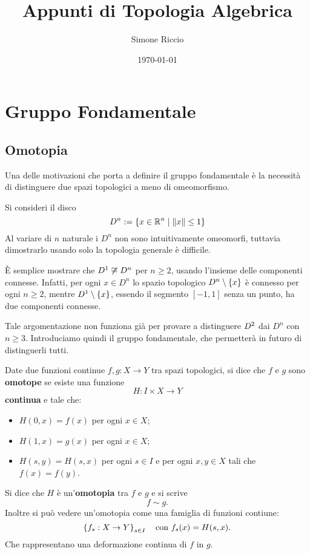 \documentclass[]{article}
\begin{document}
\title{Appunti di Topologia Algebrica}
\author{Simone Riccio}
\date{\today}

\maketitle

\tableofcontents

\section{Gruppo Fondamentale}
\subsection{Omotopia}
    Una delle motivazioni che porta a definire il gruppo fondamentale è la necessità di distinguere
    due spazi topologici a meno di omeomorfismo.

    \begin{example} \nl
        Si consideri il disco 
        \[  
            D^n := \left\{  x \in \mathbb{R}^{n} \mid \left\| x \right\| \leq 1  \right\}
        \]
        Al variare di $n$ naturale i $D^n$ non sono intuitivamente omeomorfi, tuttavia dimostrarlo
        usando solo la topologia generale è difficile.

        È semplice mostrare che $D^{1} \not\cong D^n$ per $n \geq 2$, usando l'insieme delle componenti 
        connesse. Infatti, per ogni $x \in D^n$ lo spazio topologico $D^n \setminus \left\{ x \right\}$ è connesso 
        per ogni $n \geq 2$, mentre $D^{1} \setminus \left\{ x \right\}$, essendo il segmento $[-1,1]$ senza un punto, ha due componenti connesse.
    
        Tale argomentazione non funziona già per provare a distinguere $D^{2}$ dai $D^n$ con $n \geq 3$.
        Introduciamo quindi il gruppo fondamentale, che permetterà in futuro di distinguerli tutti.
    \end{example}

    \begin{definition}[Omotopia] \nl
        Date due funzioni continue $f,g: X \to Y$ tra spazi topologici, si dice che $f$ e $g$ sono \textbf{omotope} se esiste una funzione
        \[
            H: I \times X \to Y
        \]
        \textbf{continua} e tale che:
        \begin{itemize}
            \item $H(0,x) = f(x)$ per ogni $x \in X$;
            \item $H(1,x) = g(x)$ per ogni $x \in X$;
            \item $H(s,y) = H(s,x)$ per ogni $s \in I$ e per ogni $x,y \in X$ tali che $f(x) = f(y)$.
        \end{itemize}
        Si dice che $H$ è un'\textbf{omotopia} tra $f$ e $g$ e si scrive
        \[
            f \sim g.
        \]
        Inoltre si pu\`o vedere un'omotopia come una famiglia di funzioni contiune:
        \[
            \left\{ f_s: X \to Y \right\}_{s \in I}
            \quad \text{con } f_s(x) = H(s,x).
        \]
        Che rappresentano una deformazione continua di $f$ in $g$.
    \end{definition}
\end{document}
